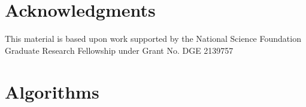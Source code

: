 \documentclass[11pt, a4paper]{include/gdm_format}
\begin{document}





\section{Acknowledgments}

This material is based upon work supported by the National Science Foundation Graduate Research Fellowship under Grant No. DGE 2139757 

\clearpage

\appendix

\section{Algorithms}
\label{appendix:algorithms}
\end{document}
